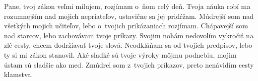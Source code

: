 Pane, tvoj zákon veľmi milujem,
rozjímam o~ňom celý deň.
\versseparator
Tvoja náuka robí ma rozumnejším nad mojich nepriateľov,
ustavične sa jej pridŕžam.
\versseparator
Múdrejší som nad všetkých mojich učiteľov,
lebo o~tvojich prikázaniach rozjímam.
\versseparator
Chápavejší som nad starcov,
lebo zachovávam tvoje príkazy.
\versseparator
Svojim nohám nedovolím vykročiť na zlé cesty,
chcem dodržiavať tvoje slová.
\versseparator
Neodkláňam sa od tvojich predpisov,
lebo ty si mi zákon stanovil.
\versseparator
Aké sladké sú tvoje výroky môjmu podnebiu,
mojim ústam sú sladšie ako med.
\versseparator
Zmúdrel som z~tvojich príkazov,
preto nenávidím cesty klamstva.